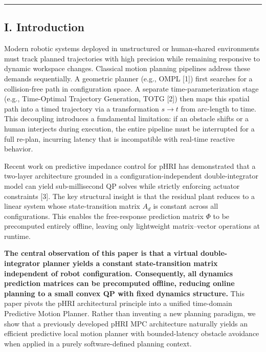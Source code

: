 \begin{center}\rule{0.5\linewidth}{0.5pt}\end{center}

\subsection{I. Introduction}\label{i.-introduction}

Modern robotic systems deployed in unstructured or human-shared
environments must track planned trajectories with high precision while
remaining responsive to dynamic workspace changes. Classical motion
planning pipelines address these demands sequentially. A geometric
planner (e.g., OMPL {[}1{]}) first searches for a collision-free path in
configuration space. A separate time-parameterization stage (e.g.,
Time-Optimal Trajectory Generation, TOTG {[}2{]}) then maps this spatial
path into a timed trajectory via a transformation \(s \rightarrow t\)
from arc-length to time. This decoupling introduces a fundamental
limitation: if an obstacle shifts or a human interjects during
execution, the entire pipeline must be interrupted for a full re-plan,
incurring latency that is incompatible with real-time reactive behavior.

Recent work on predictive impedance control for pHRI has demonstrated
that a two-layer architecture grounded in a configuration-independent
double-integrator model can yield sub-millisecond QP solves while
strictly enforcing actuator constraints {[}3{]}. The key structural
insight is that the residual plant reduces to a linear system whose
state-transition matrix \(A_d\) is constant across all configurations.
This enables the free-response prediction matrix \(\Phi\) to be
precomputed entirely offline, leaving only lightweight matrix--vector
operations at runtime.

\textbf{The central observation of this paper is that a virtual
double-integrator planner yields a constant state-transition matrix
independent of robot configuration. Consequently, all dynamics
prediction matrices can be precomputed offline, reducing online planning
to a small convex QP with fixed dynamics structure.} This paper pivots
the pHRI architectural principle into a unified time-domain Predictive
Motion Planner. Rather than inventing a new planning paradigm, we show
that a previously developed pHRI MPC architecture naturally yields an
efficient predictive local motion planner with bounded-latency obstacle
avoidance when applied in a purely software-defined planning context.

